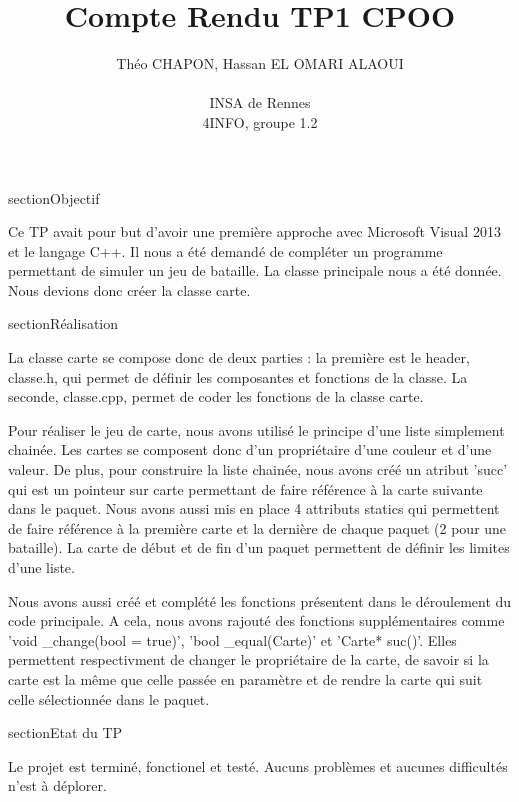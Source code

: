 \documentclass[a4paper,12pt]{article}
\author{
  Théo \textsc{CHAPON}, Hassan \textsc{EL OMARI ALAOUI} \\ \\
  INSA de Rennes \\
  4INFO, groupe 1.2
}
\title{Compte Rendu TP1 CPOO}
\begin{document}

section{Objectif}

Ce TP avait pour but d'avoir une première approche avec Microsoft Visual 2013 et le langage C++. Il nous a été demandé de 
compléter un programme permettant de simuler un jeu de bataille. La classe principale nous a été donnée. Nous devions donc 
créer la classe carte.

section{Réalisation}

La classe carte se compose donc de deux parties : la première est le header, classe.h, qui permet de définir les composantes
et fonctions de la classe. La seconde, classe.cpp, permet de coder les fonctions de la classe carte.

Pour réaliser le jeu de carte, nous avons utilisé le principe d'une liste simplement chainée. Les cartes se composent donc d'un
propriétaire d'une couleur et d'une valeur. De plus, pour construire la liste chainée, nous avons créé un atribut 'succ' qui
est un pointeur sur carte permettant de faire référence à la carte suivante dans le paquet. Nous avons aussi mis en place 4
attributs statics qui permettent de faire référence à la première carte et la dernière de chaque paquet (2 pour une bataille).
La carte de début et de fin d'un paquet permettent de définir les limites d'une liste.

Nous avons aussi créé et complété les fonctions présentent dans le déroulement du code principale. A cela, nous avons rajouté
des fonctions supplémentaires comme 'void _change(bool = true)', 'bool _equal(Carte)' et 'Carte* suc()'. Elles permettent
respectivment de changer le propriétaire de la carte, de savoir si la carte est la même que celle passée en paramètre et
de rendre la carte qui suit celle sélectionnée dans le paquet.

section{Etat du TP}

Le projet est terminé, fonctionel et testé. Aucuns problèmes et aucunes difficultés n'est à déplorer.    



\end{document}
